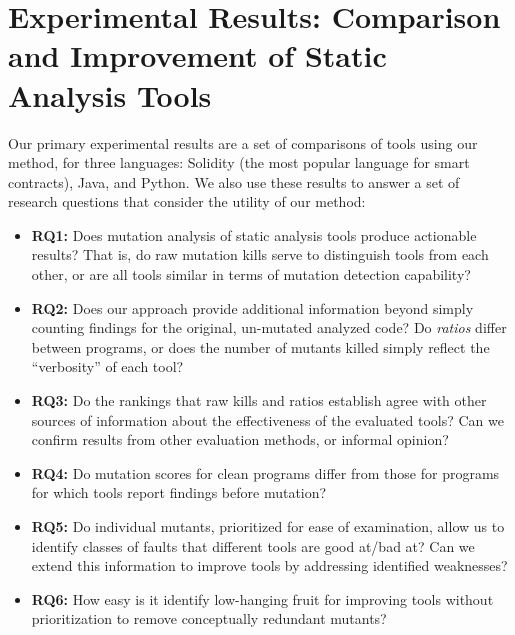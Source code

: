 \section{Experimental Results: Comparison and Improvement of Static Analysis Tools}

Our primary experimental results are a set of comparisons of tools using our method, for three languages: Solidity (the most popular language for smart contracts), Java, and Python.  We also use these results to answer a set of research questions that consider the utility of our method:

\begin{itemize}
\item {\bf RQ1:}  Does mutation analysis of static analysis tools produce actionable results?  That is, do raw mutation kills serve to distinguish tools from each other, or are all tools similar in terms of mutation detection capability?
\item {\bf RQ2:}  Does our approach provide additional information beyond simply counting findings for the original, un-mutated analyzed code?  Do \emph{ratios} differ between programs, or does the number of mutants killed simply reflect the ``verbosity'' of each tool?
\item {\bf RQ3:}  Do the rankings that raw kills and ratios establish agree with other sources of information about the effectiveness of the evaluated tools?  Can we confirm results from other evaluation methods, or informal opinion?
\item {\bf RQ4:}  Do mutation scores for clean programs differ from those for programs for which tools report findings before mutation?
\item {\bf RQ5:}  Do individual mutants, prioritized for ease of examination, allow us to identify classes of faults that
 different tools are good at/bad at?  Can we extend this information to improve tools by addressing identified weaknesses?
\item {\bf RQ6:}  How easy is it identify low-hanging fruit for improving tools without prioritization to remove conceptually redundant mutants?
  \end{itemize}

